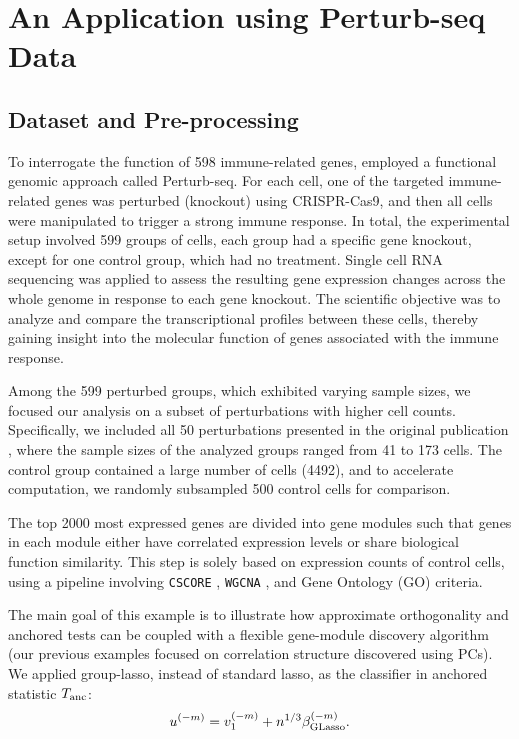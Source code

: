 \documentclass[11pt]{article}
\begin{document}
\section{An Application using Perturb-seq Data}\label{section: clearys data}

\subsection{Dataset and Pre-processing}

To interrogate the function of 598 immune-related genes,  \citet{yao2024scalable} employed a functional genomic approach called Perturb-seq. 
For each cell, one of the targeted immune-related genes was perturbed (knockout) using CRISPR-Cas9, and then all cells were manipulated to trigger a strong immune response. In total, the experimental setup involved 599 groups of cells, each group had a specific gene knockout, except for one control group, which had no treatment. Single cell RNA sequencing was applied to assess the resulting gene expression changes across the whole genome in response to each gene knockout. The scientific objective was to analyze and compare the transcriptional profiles between these cells, thereby gaining insight into the molecular function of genes associated with the immune response.  

Among the 599 perturbed groups, which exhibited varying sample sizes, we focused our analysis on a subset of perturbations with higher cell counts. Specifically, we included all 50 perturbations presented in the original publication \cite[Figure 3D, left]{yao2024scalable}, where the sample sizes of the analyzed groups ranged from 41 to 173 cells. The control group contained a large number of cells (4492), and to accelerate computation, we randomly subsampled 500 control cells for comparison. 

The top 2000 most expressed genes are divided into gene modules such that genes in each module either have correlated expression levels or share biological function similarity. This step is solely based on expression counts of control cells, using a pipeline involving \texttt{CSCORE} \cite{su2023cell}, \texttt{WGCNA} \cite{langfelder2008wgcna}, and Gene Ontology (GO) criteria. 

The main goal of this example is to illustrate how approximate orthogonality and anchored tests can be coupled with a flexible gene-module discovery algorithm (our previous examples focused on correlation structure discovered using PCs). We applied group-lasso, instead of standard lasso, as the classifier in anchored statistic $T_{\rm anc}$:
\begin{equation*}
    u^{(-m)} = v_1^{(-m)} + n^{1/3} \beta^{(-m)}_{\rm GLasso}.
\end{equation*} 
\end{document}
